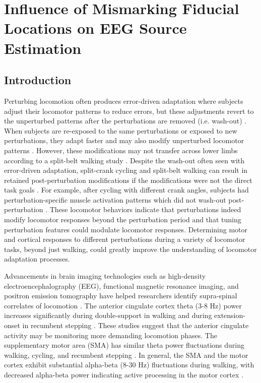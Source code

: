 \documentclass[../thesis_seyed.tex]{subfiles}
\begin{document}
\chapter{Influence of Mismarking Fiducial Locations on EEG Source Estimation}
\section{Introduction}
\label{sec:introduction}
Perturbing locomotion often produces error-driven adaptation where subjects adjust their locomotor patterns to reduce errors, but these adjustments revert to the unperturbed patterns after the perturbations are removed (i.e. wash-out) \cite{Torres-Oviedo2011-tv}. {When subjects are re-exposed to the same perturbations or exposed to new perturbations, they adapt faster and may also modify unperturbed locomotor patterns} \cite{Leech2018-sr}. {However, these modifications may not transfer across lower limbs according to a split-belt walking study} \cite{Choi2007-pc}. {Despite the wash-out often seen with error-driven adaptation, split-crank cycling and split-belt walking can result in retained post-perturbation modifications if the modifications were not the direct task goals} \cite{Alibiglou2011-sc,Maclellan2014-vk}. For example, after cycling with different crank angles, subjects had perturbation-specific muscle activation patterns which did not wash-out post-perturbation \cite{Alibiglou2011-sc}. These locomotor behaviors indicate that perturbations indeed modify locomotor responses beyond the perturbation period and that tuning perturbation features could modulate locomotor responses. Determining motor and cortical responses to different perturbations during a variety of locomotor tasks, beyond just walking, could greatly improve the understanding of locomotor adaptation processes.

Advancements in brain imaging technologies such as high-density electroencephalography (EEG), functional magnetic resonance imaging, and positron emission tomography have helped researchers identify supra-spinal correlates of locomotion \cite{Gramann2011-yj,Enders2016-id,Hinton2019-gg}. The anterior cingulate cortex theta (3-8 Hz) power increases significantly during double-support in walking and during extension-onset in recumbent stepping \cite{Bulea2015-dv,Kline2016-ci}. These studies suggest that the anterior cingulate activity may be monitoring more demanding locomotion phases. The supplementary motor area (SMA) has similar theta power fluctuations during walking, cycling, and recumbent stepping \cite{Gramann2011-yj,Jaeger2014-ao,Kline2016-ci}. In general, the SMA and the motor cortex exhibit substantial alpha-beta (8-30 Hz) fluctuations during walking, with decreased alpha-beta power indicating active processing in the motor cortex \cite{Nordin2019-gd}.
\end{document}
